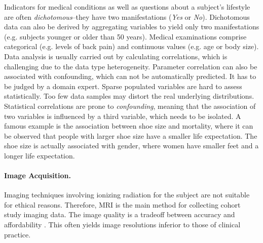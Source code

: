 \documentclass[journal]{style/vgtc} 			          %
\newcommand{\rem}[1]{\textcolor{red}{\sout{#1}}}
\begin{document}
Indicators for medical conditions as well as questions about a subject's lifestyle are often \emph{dichotomous}--they have two manifestations (\emph{Yes} or \emph{No}).
%
Dichotomous data can also be derived by aggregating variables to yield only two manifestations (e.g. subjects younger or older than 50 years).
%
Medical examinations comprise categorical (e.g. levels of back pain) and continuous values (e.g. age or body size).
%
Data analysis is usually carried out by calculating correlations,
which is challenging due to the data type heterogeneity.
%
Parameter correlation can also be associated with confounding, which can not be automatically predicted. 
%
It has to be judged by a domain expert.
%
Sparse populated variables are hard to assess statistically.
%
Too few data samples may distort the real underlying distributions.
%
Statistical correlations are prone to \emph{confounding}, meaning that the association of two variables is influenced by a third variable, which needs to be isolated.
%
A famous example is the association between shoe size and mortality, where it can be observed that people with larger shoe size have a smaller life expectation. %
%
The shoe size is actually associated with gender, where women have smaller feet and a longer life expectation.

\paragraph{Image Acquisition.} Imaging techniques involving ionizing radiation for the subject are not suitable for ethical reasons.
%
Therefore, MRI is the main method for collecting cohort study imaging data.
%
The image quality is a tradeoff between accuracy and affordability \cite{Preim2014}.
%
This often yields image resolutions inferior to those of clinical practice.%
%
\end{document}

